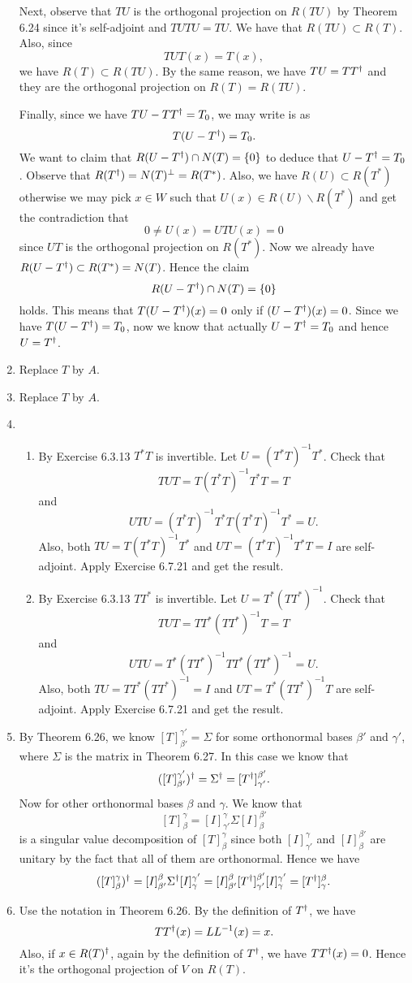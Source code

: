 \begin{enumerate}
Next, observe that $TU$ is the orthogonal projection on $R(TU)$ by Theorem 6.24 since it's self-adjoint and $TUTU=TU$. We have that $R(TU)\subset R(T)$. Also, since 
\[TUT(x)=T(x),\]
we have $R(T)\subset R(TU)$. By the same reason, we have $TU=TT^{\dagger} $ and they are the orthogonal projection on $R(T)=R(TU)$.

Finally, since we have $TU-TT^{\dagger} =T_0$, we may write is as 
\[T(U-T^{\dagger} )=T_0.\]
We want to claim that $R(U-T^{\dagger})\cap N(T)=\{0\}$ to deduce that $U-T^{\dagger} =T_0$. Observe that $R(T^{\dagger})=N(T)^{\perp}=R(T^*)$. Also, we have $R(U)\subset R(T^*)$ otherwise we may pick $x\in W$ such that $U(x)\in R(U)\backslash R(T^*)$ and get the contradiction that 
\[0\neq U(x)=UTU(x)=0\]
since $UT$ is the orthogonal projection on $R(T^*)$. Now we already have $R(U-T^{\dagger})\subset R(T^*)=N(T)$. Hence the claim 
\[R(U-T^{\dagger})\cap N(T)=\{0\}\]
holds. This means that $T(U-T^{\dagger})(x)=0$ only if $(U-T^{\dagger})(x)=0$. Since we have $T(U-T^{\dagger})=T_0$, now we know that actually $U-T^{\dagger}=T_0$ and hence $U=T^{\dagger}$.
\item Replace $T$ by $A$.
\item Replace $T$ by $A$.
\item \begin{enumerate}
\item By Exercise 6.3.13 $T^*T$ is invertible. Let $U=(T^*T)^{-1}T^*$. Check that 
\[TU T=T(T^*T)^{-1}T^*T=T\]
and 
\[UTU=(T^*T)^{-1}T^*T(T^*T)^{-1}T^*=U.\]
Also, both $TU=T(T^*T)^{-1}T^*$ and $UT=(T^*T)^{-1}T^*T=I$ are self-adjoint. Apply Exercise 6.7.21 and get the result.
\item By Exercise 6.3.13 $TT^*$ is invertible. Let $U=T^*(TT^*)^{-1}$. Check that 
\[TUT=TT^*(TT^*)^{-1}T=T\]
and 
\[UTU=T^*(TT^*)^{-1}TT^*(TT^*)^{-1}=U.\]
Also, both $TU=TT^*(TT^*)^{-1}=I$ and $UT=T^*(TT^*)^{-1}T$ are self-adjoint. Apply Exercise 6.7.21 and get the result.
\end{enumerate}
\item By Theorem 6.26, we know $[T]_{\beta'}^{\gamma'}=\Sigma $ for some orthonormal bases $\beta'$ and $\gamma'$, where $\Sigma $ is the matrix in Theorem 6.27. In this case we know that 
\[([T]_{\beta'}^{\gamma'})^{\dagger}=\Sigma ^{\dagger} =[T^{\dagger}]_{\gamma'}^{\beta'}.\]
Now for other orthonormal bases $\beta $ and $\gamma$. We know that 
\[[T]_{\beta}^{\gamma}=[I]_{\gamma'}^{\gamma}\Sigma [I]_{\beta}^{\beta'}\]
is a singular value decomposition of $[T]_{\beta}^{\gamma}$ since both $[I]_{\gamma'}^{\gamma}$ and $[I]_{\beta}^{\beta'}$ are unitary by the fact that all of them are orthonormal. Hence we have 
\[([T]_{\beta}^{\gamma})^{\dagger} =[I]_{\beta'}^{\beta}\Sigma ^{\dagger} [I]_{\gamma}^{\gamma'}=[I]_{\beta'}^{\beta}[T^{\dagger}]_{\gamma'}^{\beta'}[I]_{\gamma}^{\gamma'}=[T^{\dagger}]_{\gamma}^{\beta}.\]
\item Use the notation in Theorem 6.26. By the definition of $T^{\dagger} $, we have 
\[TT^{\dagger} (x)=LL^{-1}(x)=x.\]
Also, if $x\in R(T)^{\dagger}$, again by the definition of $T^{\dagger} $, we have $TT^{\dagger}(x)=0$. Hence it's the orthogonal projection of $V$ on $R(T)$.
\end{enumerate}